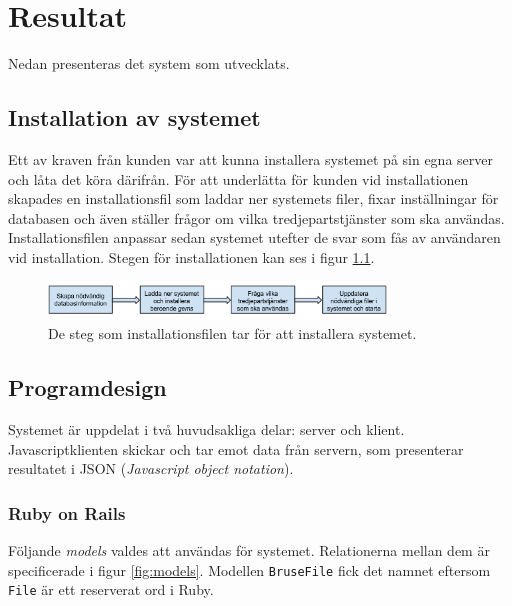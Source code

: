 \chapter{Resultat}

Nedan presenteras det system som utvecklats.

\section{Installation av systemet}
Ett av kraven från kunden var att kunna installera systemet på sin egna server
och låta det köra därifrån. För att underlätta för kunden vid installationen
skapades en installationsfil som laddar ner systemets filer, fixar
inställningar för databasen och även ställer frågor om vilka
tredjepartstjänster som ska användas. Installationsfilen anpassar sedan
systemet utefter de svar som fås av användaren vid installation. Stegen för
installationen kan ses i figur \ref{fig:installation}.

\begin{figure}[!h]
\centering
\includegraphics[width=0.8\textwidth]{figures/installation.png}
\caption{De steg som installationsfilen tar för att installera systemet.}
\label{fig:installation}
\end{figure}

\section{Programdesign}

Systemet är uppdelat i två huvudsakliga delar: server och klient.
Javascriptklienten skickar och tar emot data från servern, som presenterar
resultatet i JSON (\emph{Javascript object notation}).

\subsection{Ruby on Rails}

Följande \emph{models} valdes att användas för systemet. Relationerna mellan
dem är specificerade i figur \ref{fig:models}. Modellen \texttt{BruseFile} fick
det namnet eftersom \texttt{File} är ett reserverat ord i Ruby.

